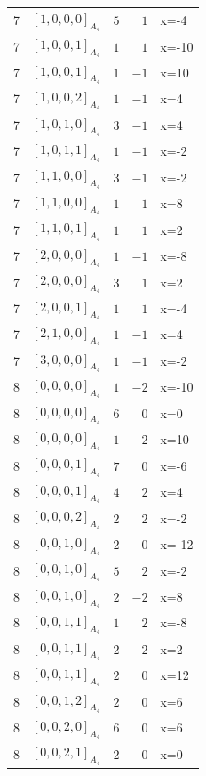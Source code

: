 \documentclass[11pt]{article}
\newcommand{\Dynkin}[1]{#1}
\begin{document}
\begin{longtable}{r l r r l}
7 & $\Dynkin{[1,0,0,0]_{A_4}}$ & $5$ & $1$ & x=-4\\
7 & $\Dynkin{[1,0,0,1]_{A_4}}$ & $1$ & $1$ & x=-10\\
7 & $\Dynkin{[1,0,0,1]_{A_4}}$ & $1$ & $-1$ & x=10\\
7 & $\Dynkin{[1,0,0,2]_{A_4}}$ & $1$ & $-1$ & x=4\\
7 & $\Dynkin{[1,0,1,0]_{A_4}}$ & $3$ & $-1$ & x=4\\
7 & $\Dynkin{[1,0,1,1]_{A_4}}$ & $1$ & $-1$ & x=-2\\
7 & $\Dynkin{[1,1,0,0]_{A_4}}$ & $3$ & $-1$ & x=-2\\
7 & $\Dynkin{[1,1,0,0]_{A_4}}$ & $1$ & $1$ & x=8\\
7 & $\Dynkin{[1,1,0,1]_{A_4}}$ & $1$ & $1$ & x=2\\
7 & $\Dynkin{[2,0,0,0]_{A_4}}$ & $1$ & $-1$ & x=-8\\
7 & $\Dynkin{[2,0,0,0]_{A_4}}$ & $3$ & $1$ & x=2\\
7 & $\Dynkin{[2,0,0,1]_{A_4}}$ & $1$ & $1$ & x=-4\\
7 & $\Dynkin{[2,1,0,0]_{A_4}}$ & $1$ & $-1$ & x=4\\
7 & $\Dynkin{[3,0,0,0]_{A_4}}$ & $1$ & $-1$ & x=-2\\
8 & $\Dynkin{[0,0,0,0]_{A_4}}$ & $1$ & $-2$ & x=-10\\
8 & $\Dynkin{[0,0,0,0]_{A_4}}$ & $6$ & $0$ & x=0\\
8 & $\Dynkin{[0,0,0,0]_{A_4}}$ & $1$ & $2$ & x=10\\
8 & $\Dynkin{[0,0,0,1]_{A_4}}$ & $7$ & $0$ & x=-6\\
8 & $\Dynkin{[0,0,0,1]_{A_4}}$ & $4$ & $2$ & x=4\\
8 & $\Dynkin{[0,0,0,2]_{A_4}}$ & $2$ & $2$ & x=-2\\
8 & $\Dynkin{[0,0,1,0]_{A_4}}$ & $2$ & $0$ & x=-12\\
8 & $\Dynkin{[0,0,1,0]_{A_4}}$ & $5$ & $2$ & x=-2\\
8 & $\Dynkin{[0,0,1,0]_{A_4}}$ & $2$ & $-2$ & x=8\\
8 & $\Dynkin{[0,0,1,1]_{A_4}}$ & $1$ & $2$ & x=-8\\
8 & $\Dynkin{[0,0,1,1]_{A_4}}$ & $2$ & $-2$ & x=2\\
8 & $\Dynkin{[0,0,1,1]_{A_4}}$ & $2$ & $0$ & x=12\\
8 & $\Dynkin{[0,0,1,2]_{A_4}}$ & $2$ & $0$ & x=6\\
8 & $\Dynkin{[0,0,2,0]_{A_4}}$ & $6$ & $0$ & x=6\\
8 & $\Dynkin{[0,0,2,1]_{A_4}}$ & $2$ & $0$ & x=0\\

\end{longtable}
\end{document}
